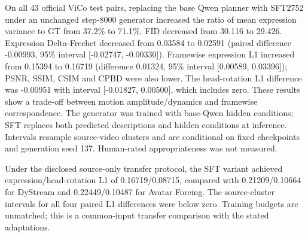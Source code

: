 On all 43 official ViCo test pairs, replacing the base Qwen planner with SFT2752 under an unchanged step-8000 generator increased the ratio of mean expression variance to GT from 37.2\% to 71.1\%. FID decreased from 30.116 to 29.426. Expression Delta-Frechet decreased from 0.03584 to 0.02591 (paired difference -0.00993, 95\% interval [-0.02747, -0.00330]). Framewise expression L1 increased from 0.15394 to 0.16719 (difference 0.01324, 95\% interval [0.00589, 0.03396]); PSNR, SSIM, CSIM and CPBD were also lower. The head-rotation L1 difference was -0.00951 with interval [-0.01827, 0.00500], which includes zero. These results show a trade-off between motion amplitude/dynamics and framewise correspondence. The generator was trained with base-Qwen hidden conditions; SFT replaces both predicted descriptions and hidden conditions at inference. Intervals resample source-video clusters and are conditional on fixed checkpoints and generation seed 137. Human-rated appropriateness was not measured.

Under the disclosed source-only transfer protocol, the SFT variant achieved expression/head-rotation L1 of 0.16719/0.08715, compared with 0.21209/0.10664 for DyStream and 0.22449/0.10487 for Avatar Forcing. The source-cluster intervals for all four paired L1 differences were below zero. Training budgets are unmatched; this is a common-input transfer comparison with the stated adaptations.
